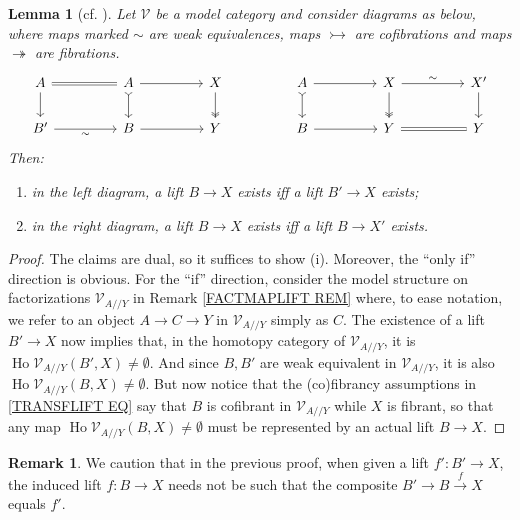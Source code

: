 \documentclass[a4paper,10pt
,draft
]{article}%
\numberwithin{equation}{section}
\numberwithin{figure}{section}
\newtheorem{lemma}[equation]{Lemma}%
\theoremstyle{definition} %
\newtheorem{remark}[equation]{Remark}%
\DeclareMathOperator{\Ho}{Ho}
\newcommand{\V}{\ensuremath{\mathcal V}}
\newcommand{\1}{\ensuremath{\mathbbm 1}}%
\begin{document}
\begin{lemma}[{cf. \cite[Lemma 2.6]{Ber07b}}]
\label{TRANSFLIFT LEMMA}
Let $\V$ be a model category and consider diagrams as below, 
where maps marked $\sim$ are weak equivalences, 
maps $\rightarrowtail$ are cofibrations
and maps $\twoheadrightarrow$ are fibrations.
\begin{equation}\label{TRANSFLIFT EQ}
\begin{tikzcd}[column sep = 45pt]
	A
	\ar{d}
	\arrow[equal]{r}
&
	A \ar{r}
	\arrow[rightarrowtail]{d}
&
	X \arrow[twoheadrightarrow]{d}
&%
	A
	\ar[rightarrowtail]{d}
	\arrow{r}
&
	X
	\arrow[twoheadrightarrow]{d} \ar{r}{\sim}
&
	X' \ar{d}
\\
	B'
	\arrow{r}[swap]{\sim}
&
	B\ar{r}
&
	Y
&%
	B
	\arrow{r}
&
	Y \ar[equal]{r}
&
	Y
\end{tikzcd}
\end{equation}
Then:
\begin{enumerate}[label=(\roman*)]
\item in the left diagram, 
a lift $B \to X$ %
exists iff
a lift $B' \to X$ %
exists;
\item in the right diagram, 
a lift $B \to X$ %
exists iff
a lift $B \to X'$ %
exists.
\end{enumerate}
\end{lemma}


\begin{proof}
The claims are dual, so it suffices to show (i). Moreover, the ``only if'' direction is obvious.
For the ``if'' direction,
consider the model structure on factorizations  
$\V_{A//Y}$
in Remark \ref{FACTMAPLIFT REM} where, to ease notation, 
we refer to an object $A \to C \to Y$ in $\V_{A//Y}$
simply as $C$.
The existence of a lift $B' \to X$ now implies that,
in the homotopy category of $\V_{A//Y}$, it is
$\Ho \V_{A//Y}(B',X) \neq \emptyset$.
And since $B,B'$ are weak equivalent in 
$\V_{A//Y}$, it is also 
$\Ho \V_{A//Y}(B,X) \neq \emptyset$.
But now notice that the (co)fibrancy assumptions in \eqref{TRANSFLIFT EQ}
say that $B$ is cofibrant in $\V_{A//Y}$ while 
$X$ is fibrant, so that any map $\Ho \V_{A//Y}(B,X) \neq \emptyset$
must be represented by an actual lift $B \to X$.
\end{proof}


\begin{remark}\label{NOTMATCH REM}
We caution that in the previous proof, when given a lift $f'\colon B' \to X$,
the induced lift $f \colon B \to X$
needs not be such that the composite $B' \to B \xrightarrow{f} X$
equals $f'$.
\end{remark}
\end{document}
